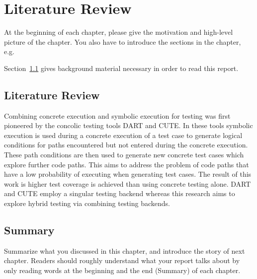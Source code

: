 \chapter{Literature Review}
\label{cha:literature_review}

At the beginning of each chapter, please give the motivation and
high-level picture of the chapter. You also have to introduce the sections
in the chapter, e.g.\

  Section~\ref{sec:literature_review} gives background material necessary in
  order to read this report.

  
\section{Literature Review}
\label{sec:literature_review}
Combining concrete execution and symbolic execution for testing was first pioneered by the concolic testing tools DART and CUTE. In these tools symbolic execution is used during a concrete execution of a test case to generate logical conditions for paths encountered but not entered during the concrete execution. These path conditions are then used to generate new concrete test cases which explore further code paths. This aims to address the problem of code paths that have a low probability of executing when generating test cases. The result of this work is higher test coverage is achieved than using concrete testing alone. DART and CUTE employ a singular testing backend whereas this research aims to explore hybrid testing via combining testing backends. 


\section{Summary}

Summarize what you discussed in this chapter, and introduce the story
of next chapter. Readers should roughly understand what your report
talks about by only reading words at the beginning and the end
(Summary) of each chapter.



